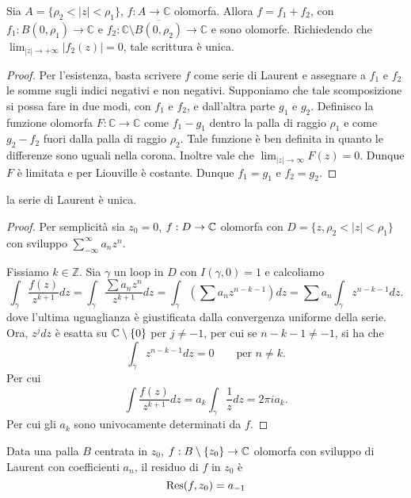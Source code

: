 \begin{cor}
    Sia $A = \{\rho_2<|z|<\rho_1\}$, $f:A\rightarrow \mathbb{C}$ olomorfa.
    Allora $f = f_1 + f_2$, con $f_1:B(0,\rho_1)\rightarrow\mathbb{C}$ e $f_2:
    \mathbb{C}\setminus \overline{B(0,\rho_2)}\rightarrow\mathbb{C}$ e sono
    olomorfe. Richiedendo che $\lim_{|z|\rightarrow +\infty} |f_2(z)| = 0$,
    tale scrittura \`e unica.
\end{cor}
\begin{proof}
    Per l'esistenza, basta scrivere $f$ come serie di Laurent e assegnare a
    $f_1$ e $f_2$ le somme sugli indici negativi e non negativi.
    Supponiamo che tale scomposizione si possa fare in due modi, con $f_1$ e
    $f_2$, e dall'altra parte $g_1$ e $g_2$.
    Definisco la funzione olomorfa $F:\mathbb{C}\rightarrow\mathbb{C}$ come 
    $f_1-g_1$ dentro la palla di raggio $\rho_1$ e come $g_2-f_2$ fuori dalla
    palla di raggio $\rho_2$. Tale funzione \`e ben definita in quanto le
    differenze sono uguali nella corona. Inoltre vale che $\lim_{|z|\rightarrow
    \infty} F(z) = 0$. Dunque $F$ \`e limitata e per Liouville \`e costante.
    Dunque $f_1=g_1$ e $f_2 = g_2$.
\end{proof}

\begin{thm}
    la serie di Laurent \`e unica.
\end{thm}
\begin{proof}
    Per semplicit\`a sia $z_0=0$, $f:D\rightarrow\mathbb{C}$ olomorfa con $D = \{z,
    \rho_2<|z|<\rho_1\}$ con sviluppo $\sum_{-\infty}^\infty a_nz^n$.

    Fissiamo $k\in\mathbb{Z}$. Sia $\gamma$ un loop in $D$ con $I(\gamma,0)=1$ e
    calcoliamo
    \[
        \int_\gamma \frac{f(z)}{z^{k+1}}dz = 
        \int_\gamma \frac{\sum a_nz^n}{z^{k+1}}dz = 
        \int_\gamma (\sum a_nz^{n-k-1})dz = 
        \sum a_n \int_\gamma z^{n-k-1}dz.
    \]
    dove l'ultima uguaglianza \`e giustificata dalla convergenza uniforme della
    serie.
    Ora, $z^jdz$ \`e esatta su $\mathbb{C}\setminus\{0\}$ per $j\neq -1$, per cui se
    $n-k-1\neq -1$, si ha che
    \[
        \int_\gamma z^{n-k-1}dz = 0 \qquad \text{per $n\neq k$}.
    \]
    Per cui
    \[
        \int\frac{f(z)}{z^{k+1}}dz = a_k \int_\gamma\frac{1}{z}dz = 2\pi i a_k.
    \]
    Per cui gli $a_k$ sono univocamente determinati da $f$.
\end{proof}

\begin{defn}
    Data una palla $B$ centrata in $z_0$, $f:B\setminus\{z_0\}\rightarrow\mathbb{C}$
    olomorfa con sviluppo di Laurent con coefficienti $a_n$, il residuo di $f$
    in $z_0$ \`e
    \[
        \text{Res}(f,z_0)=a_{-1}
    \]
\end{defn}

